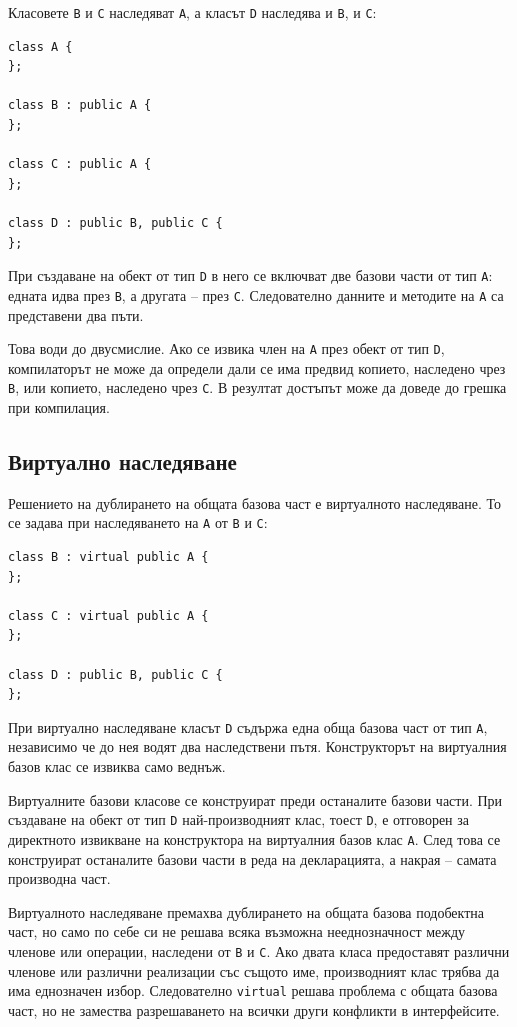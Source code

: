 Класовете \texttt{B} и \texttt{C} наследяват \texttt{A}, а класът \texttt{D} наследява и \texttt{B}, и \texttt{C}:

\begin{verbatim}
class A {
};

class B : public A {
};

class C : public A {
};

class D : public B, public C {
};
\end{verbatim}

При създаване на обект от тип \texttt{D} в него се включват две базови части от тип \texttt{A}: едната идва през \texttt{B}, а другата -- през \texttt{C}. Следователно данните и методите на \texttt{A} са представени два пъти.

Това води до двусмислие. Ако се извика член на \texttt{A} през обект от тип \texttt{D}, компилаторът не може да определи дали се има предвид копието, наследено чрез \texttt{B}, или копието, наследено чрез \texttt{C}. В резултат достъпът може да доведе до грешка при компилация.

\subsection{Виртуално наследяване}\label{s:17.6.3}

Решението на дублирането на общата базова част е виртуалното наследяване. То се задава при наследяването на \texttt{A} от \texttt{B} и \texttt{C}:

\begin{verbatim}
class B : virtual public A {
};

class C : virtual public A {
};

class D : public B, public C {
};
\end{verbatim}

При виртуално наследяване класът \texttt{D} съдържа една обща базова част от тип \texttt{A}, независимо че до нея водят два наследствени пътя. Конструкторът на виртуалния базов клас се извиква само веднъж.

Виртуалните базови класове се конструират преди останалите базови части. При създаване на обект от тип \texttt{D} най-производният клас, тоест \texttt{D}, е отговорен за директното извикване на конструктора на виртуалния базов клас \texttt{A}. След това се конструират останалите базови части в реда на декларацията, а накрая -- самата производна част.

\begin{supp}
Виртуалното наследяване премахва дублирането на общата базова подобектна част, но само по себе си не решава всяка възможна нееднозначност между членове или операции, наследени от \texttt{B} и \texttt{C}. Ако двата класа предоставят различни членове или различни реализации със същото име, производният клас трябва да има еднозначен избор. Следователно \texttt{virtual} решава проблема с общата базова част, но не замества разрешаването на всички други конфликти в интерфейсите.
\end{supp}

